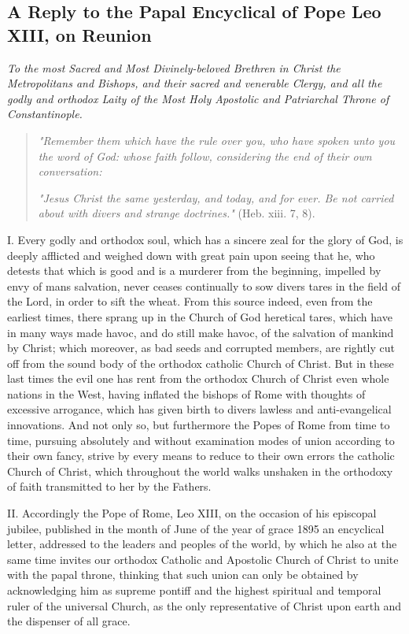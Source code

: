 \subsection{A Reply to the Papal Encyclical of Pope Leo XIII, on
Reunion}\label{a-reply-to-the-papal-encyclical-of-pope-leo-xiii-on-reunion}

\emph{To the most Sacred and Most Divinely-beloved Brethren in Christ
the Metropolitans and Bishops, and their sacred and venerable Clergy,
and all the godly and orthodox Laity of the Most Holy Apostolic and
Patriarchal Throne of Constantinople.}

\begin{quote}
\emph{"Remember them which have the rule over you, who have spoken unto
you the word of God: whose faith follow, considering the end of their
own conversation:}

\emph{"Jesus Christ the same yesterday, and today, and for ever. Be not
carried about with divers and strange doctrines."} (Heb. xiii. 7, 8).
\end{quote}

I. Every godly and orthodox soul, which has a sincere zeal for the glory
of God, is deeply afflicted and weighed down with great pain upon seeing
that he, who detests that which is good and is a murderer from the
beginning, impelled by envy of man\textquotesingle s salvation, never
ceases continually to sow divers tares in the field of the Lord, in
order to sift the wheat. From this source indeed, even from the earliest
times, there sprang up in the Church of God heretical tares, which have
in many ways made havoc, and do still make havoc, of the salvation of
mankind by Christ; which moreover, as bad seeds and corrupted members,
are rightly cut off from the sound body of the orthodox catholic Church
of Christ. But in these last times the evil one has rent from the
orthodox Church of Christ even whole nations in the West, having
inflated the bishops of Rome with thoughts of excessive arrogance, which
has given birth to divers lawless and anti-evangelical innovations. And
not only so, but furthermore the Popes of Rome from time to time,
pursuing absolutely and without examination modes of union according to
their own fancy, strive by every means to reduce to their own errors the
catholic Church of Christ, which throughout the world walks unshaken in
the orthodoxy of faith transmitted to her by the Fathers.

II. Accordingly the Pope of Rome, Leo XIII, on the occasion of his
episcopal jubilee, published in the month of June of the year of grace
1895 an encyclical letter, addressed to the leaders and peoples of the
world, by which he also at the same time invites our orthodox Catholic
and Apostolic Church of Christ to unite with the papal throne, thinking
that such union can only be obtained by acknowledging him as supreme
pontiff and the highest spiritual and temporal ruler of the universal
Church, as the only representative of Christ upon earth and the
dispenser of all grace.

